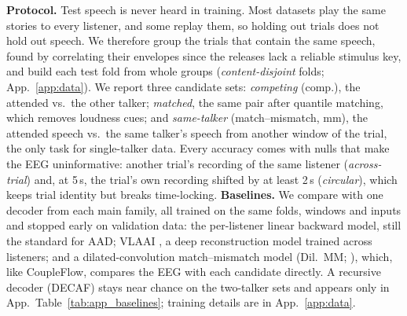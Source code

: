 \documentclass[twoside]{article}
\begin{document}
\textbf{Protocol.} Test speech is never heard in training. Most datasets play the same
stories to every listener, and some replay them, so holding out trials does not hold out
speech. We therefore group the trials that contain the same speech, found by correlating
their envelopes since the releases lack a reliable stimulus key, and build each test fold
from whole groups (\emph{content-disjoint} folds; App.~\ref{app:data}). We report three
candidate sets: \emph{competing} (comp.), the attended vs.\ the other talker; \emph{matched},
the same pair after quantile matching, which removes loudness cues; and \emph{same-talker}
(match--mismatch, mm), the attended speech vs.\ the same talker's speech from another window
of the trial, the only task for single-talker data. Every accuracy comes with nulls that
make the EEG uninformative: another trial's recording of the same listener
(\emph{across-trial}) and, at 5\,s, the trial's own recording shifted by at least 2\,s
(\emph{circular}), which keeps trial identity but breaks time-locking.
\textbf{Baselines.} We compare with one decoder from each main family, all trained on the
same folds, windows and inputs and stopped early on validation data: the per-listener linear
backward model, still the standard for AAD; VLAAI \citep{accou2023vlaai}, a deep
reconstruction model trained across listeners; and a dilated-convolution match--mismatch
model (Dil.\ MM; \citealp{accou2021dilated}), which, like CoupleFlow, compares the EEG with
each candidate directly. A recursive decoder (DECAF) stays near chance on the two-talker sets
and appears only in App.~Table~\ref{tab:app_baselines}; training details are in
App.~\ref{app:data}.

\begin{table}[!t]\centering\small
\caption{Accuracy (\%) of CoupleFlow (Ours) and the baselines at 1, 5 and 20\,s on the
content-disjoint folds (every model trained and tested on the same folds), and on unseen
listeners (LOSO: listener and content held out, 5\,s) against the pooled linear backward
model. comp.: attended vs.\ competing talker; mm: match--mismatch. Ours: mean of 3 seeds
(s.d.\ \sdMin--\sdMax{} at 5\,s); LOSO: one seed. Bold: best per group. CoupleFlow's
EEG-shuffle nulls lie in [\nullShortMin, \nullShortMax] up to 10\,s. All windows and per-trial accuracy: App.~Table~\ref{tab:app_baselines};
full LOSO results: App.~Table~\ref{tab:loso}.}\label{tab:main}
\setlength{\tabcolsep}{3.2pt}
\resizebox{\textwidth}{!}{}
\end{table}
\end{document}
